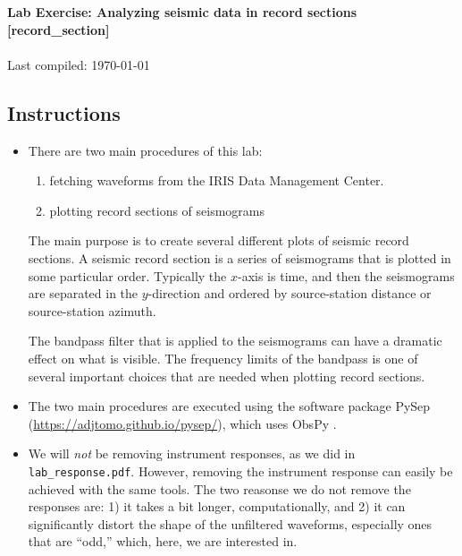 \documentclass[11pt,titlepage,fleqn]{article}
\begin{document}

\begin{spacing}{1.2}
\centering
{\large \bf Lab Exercise: Analyzing seismic data in record sections [record\_section]} \\
\cltag\ \\
Last compiled: \today
\end{spacing}

\vspace{-0.25cm}
\subsection*{Instructions}

\begin{itemize}
\item There are two main procedures of this lab:
\begin{enumerate}
\item fetching waveforms from the IRIS Data Management Center.
\item plotting record sections of seismograms
\end{enumerate}
%
The main purpose is to create several different plots of seismic record sections. A seismic record section is a series of seismograms that is plotted in some particular order. Typically the $x$-axis is time, and then the seismograms are separated in the $y$-direction and ordered by source-station distance or source-station azimuth.

The bandpass filter that is applied to the seismograms can have a dramatic effect on what is visible. The frequency limits of the bandpass is one of several important choices that are needed when plotting record sections.

\item The two main procedures are executed using the software package PySep (\url{https://adjtomo.github.io/pysep/}), which uses ObsPy \citep{obspy2010,obspy2011,obspy2015}.

\item We will {\em not} be removing instrument responses, as we did in \verb+lab_response.pdf+. However, removing the instrument response can easily be achieved with the same tools. The two reasonse we do not remove the responses are: 1) it takes a bit longer, computationally, and 2) it can significantly distort the shape of the unfiltered waveforms, especially ones that are ``odd,'' which, here, we are interested in.


\end{itemize}
\end{document}
